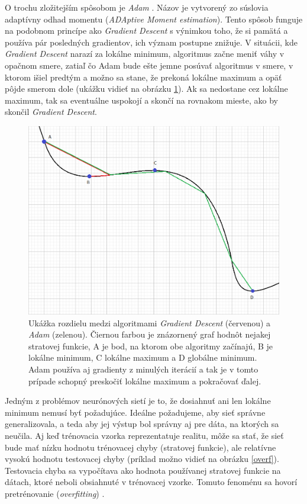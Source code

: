 O trochu zložitejším spôsobom je \textit{Adam} \citep{adam}.
Názov je vytvorený zo súslovia adaptívny odhad momentu (\textit{ADAptive Moment estimation}).
Tento spôsob funguje na podobnom princípe ako \textit{Gradient Descent} s výnimkou toho, že si pamätá a používa pár posledných gradientov, ich význam postupne znižuje.
V situácii, kde \textit{Gradient Descent} narazí za lokálne minimum, algoritmus začne meniť váhy v opačnom smere, zatiaľ čo Adam bude ešte jemne posúvať algoritmus v smere, v ktorom išiel predtým a možno sa stane, že prekoná lokálne maximum a opäť pôjde smerom dole (ukážku vidieť na obrázku \ref{adam}). Ak sa nedostane cez lokálne maximum, tak sa eventuálne uspokojí a skončí na rovnakom mieste, ako by skončil \textit{Gradient Descent}.
\noindent
\begin{figure} 
\includegraphics[width=\textwidth]{../img/gd_adam.png}
\caption{Ukážka rozdielu medzi algoritmami \textit{Gradient Descent} (červenou) a \textit{Adam} (zelenou). Čiernou farbou je znázornený graf hodnôt nejakej stratovej funkcie, A je bod, na ktorom obe algoritmy začínajú, B je lokálne minimum, C lokálne maximum a D globálne minimum. Adam používa aj gradienty z minulých iterácií a tak je v tomto prípade schopný preskočiť lokálne maximum a pokračovať ďalej.}
\label{adam}
\end{figure}

Jedným z problémov neurónových sietí je to, že dosiahnuť ani len lokálne minimum nemusí byť požadujúce.
Ideálne požadujeme, aby sieť správne generalizovala, a teda aby jej výstup bol správny aj pre dáta, na ktorých sa neučila.
Aj keď trénovacia vzorka reprezentatuje realitu, môže sa stať, že sieť bude mať nízku hodnotu trénovacej chyby (stratovej funkcie), ale relatívne vysokú hodnotu testovacej chyby (príklad možno vidieť na obrázku \ref{overf}). Testovacia chyba sa vypočítava ako hodnota používanej stratovej funkcie na dátach, ktoré neboli obsiahnuté v trénovacej vzorke.
Tomuto fenoménu sa hovorí pretrénovanie (\textit{overfitting}) \citep{overfit}.

